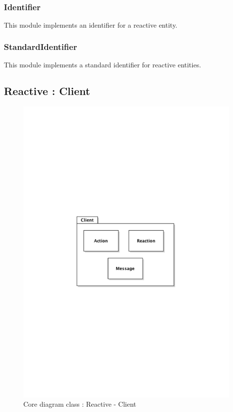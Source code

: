 		\subsubsection{Identifier}
			This module implements an identifier for a reactive entity.
		\subsubsection{StandardIdentifier}
			This module implements a standard identifier for reactive entities. 
\newpage
	\subsection{Reactive : Client}
		\begin{figure}[ht]
			\begin{center}
				\includegraphics[width=\textwidth,  trim=2cm 11cm 2cm 10cm]{UML_figure/DC/core/reactive/DC_Client.pdf}
				\caption{Core diagram class : Reactive - Client}
			\end{center}
		\end{figure}
